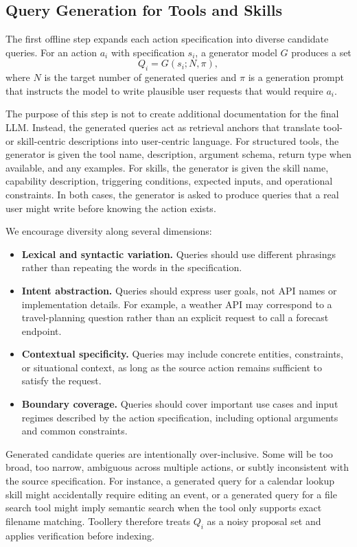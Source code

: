 \subsection{Query Generation for Tools and Skills}
\label{sec:query_generation}

The first offline step expands each action specification into diverse candidate queries. For an action $a_i$ with specification $s_i$, a generator model $G$ produces a set
\begin{equation}
    Q_i = G(s_i; N, \pi),
\end{equation}
where $N$ is the target number of generated queries and $\pi$ is a generation prompt that instructs the model to write plausible user requests that would require $a_i$.

The purpose of this step is not to create additional documentation for the final LLM. Instead, the generated queries act as retrieval anchors that translate tool- or skill-centric descriptions into user-centric language. For structured tools, the generator is given the tool name, description, argument schema, return type when available, and any examples. For skills, the generator is given the skill name, capability description, triggering conditions, expected inputs, and operational constraints. In both cases, the generator is asked to produce queries that a real user might write before knowing the action exists.

We encourage diversity along several dimensions:
\begin{itemize}
    \item \textbf{Lexical and syntactic variation.} Queries should use different phrasings rather than repeating the words in the specification.
    \item \textbf{Intent abstraction.} Queries should express user goals, not API names or implementation details. For example, a weather API may correspond to a travel-planning question rather than an explicit request to call a forecast endpoint.
    \item \textbf{Contextual specificity.} Queries may include concrete entities, constraints, or situational context, as long as the source action remains sufficient to satisfy the request.
    \item \textbf{Boundary coverage.} Queries should cover important use cases and input regimes described by the action specification, including optional arguments and common constraints.
\end{itemize}

Generated candidate queries are intentionally over-inclusive. Some will be too broad, too narrow, ambiguous across multiple actions, or subtly inconsistent with the source specification. For instance, a generated query for a calendar lookup skill might accidentally require editing an event, or a generated query for a file search tool might imply semantic search when the tool only supports exact filename matching. Toollery therefore treats $Q_i$ as a noisy proposal set and applies verification before indexing.

